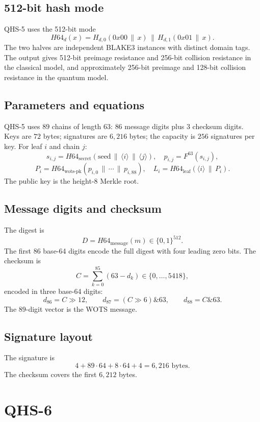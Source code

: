 \documentclass[11pt,a4paper]{article}
\theoremstyle{remark}
\newcommand{\concat}{\,\|\,}
\newcommand{\bits}{\{0,1\}}
\begin{document}
\subsection{512-bit hash mode}

QHS-5 uses the 512-bit mode
\[
H64_d(x)=H_{d,0}(0x00\concat x)\concat H_{d,1}(0x01\concat x).
\]
The two halves are independent BLAKE3 instances with distinct domain tags. The
output gives 512-bit preimage resistance and 256-bit collision resistance in the
classical model, and approximately 256-bit preimage and 128-bit collision
resistance in the quantum model.

\subsection{Parameters and equations}

QHS-5 uses \(89\) chains of length \(63\): \(86\) message digits plus \(3\)
checksum digits. Keys are \(72\) bytes; signatures are \(6{,}216\) bytes; the
capacity is \(256\) signatures per key. For leaf \(i\) and chain \(j\):
\[
s_{i,j}=H64_{\text{secret}}(\mathrm{seed}\concat\langle i\rangle\concat\langle j\rangle),
\quad
p_{i,j}=F^{63}(s_{i,j}),
\]
\[
P_i=H64_{\text{wots-pk}}(p_{i,0}\concat\cdots\concat p_{i,88}),
\quad
L_i=H64_{\text{leaf}}(\langle i\rangle\concat P_i).
\]
The public key is the height-8 Merkle root.

\subsection{Message digits and checksum}

The digest is
\[
D=H64_{\text{message}}(m)\in\bits^{512}.
\]
The first \(86\) base-64 digits encode the full digest with four leading zero
bits. The checksum is
\[
C=\sum_{k=0}^{85}(63-d_k)\in\{0,\dots,5418\},
\]
encoded in three base-64 digits:
\[
d_{86}=C\gg 12,\qquad
d_{87}=(C\gg 6)\&63,\qquad
d_{88}=C\&63.
\]
The \(89\)-digit vector is the WOTS message.

\subsection{Signature layout}

The signature is
\[
4+89\cdot 64+8\cdot 64+4=6{,}216\text{ bytes}.
\]
The checksum covers the first \(6{,}212\) bytes.

\section{QHS-6}
\end{document}
